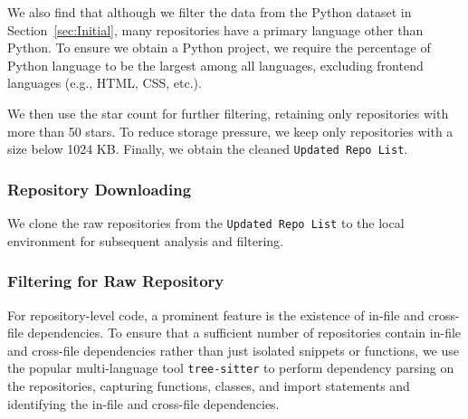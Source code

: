 We also find that although we filter the data from the Python dataset in Section~\ref{sec:Initial}, many repositories have a primary language other than Python. To ensure we obtain a Python project, we require the percentage of Python language to be the largest among all languages, excluding frontend languages (e.g., HTML, CSS, etc.).

We then use the star count for further filtering, retaining only repositories with more than 50 stars. To reduce storage pressure, we keep only repositories with a size below 1024 KB. Finally, we obtain the cleaned \texttt{Updated Repo List}.


\subsubsection{Repository Downloading}

We clone the raw repositories from the \texttt{Updated Repo List} to the local environment for subsequent analysis and filtering.


\subsubsection{Filtering for Raw Repository}

For repository-level code, a prominent feature is the existence of in-file and cross-file dependencies. To ensure that a sufficient number of repositories contain in-file and cross-file dependencies rather than just isolated snippets or functions, we use the popular multi-language tool \texttt{tree-sitter} to perform dependency parsing on the repositories, capturing functions, classes, and import statements and identifying the in-file and cross-file dependencies.

